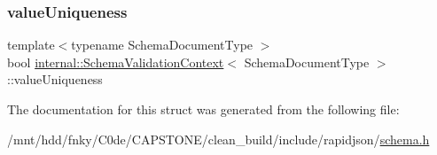 \mbox{\label{structinternal_1_1SchemaValidationContext_a23e93ca88653ed878e3ddf290fc6bd9f}} 
\subsubsection{\texorpdfstring{value\+Uniqueness}{valueUniqueness}}
{\footnotesize\ttfamily template$<$typename Schema\+Document\+Type $>$ \\
bool \hyperlink{structinternal_1_1SchemaValidationContext}{internal\+::\+Schema\+Validation\+Context}$<$ Schema\+Document\+Type $>$\+::value\+Uniqueness}



The documentation for this struct was generated from the following file\+:\begin{DoxyCompactItemize}
\item 
/mnt/hdd/fnky/\+C0de/\+C\+A\+P\+S\+T\+O\+N\+E/clean\+\_\+build/include/rapidjson/\hyperlink{schema_8h}{schema.\+h}\end{DoxyCompactItemize}
